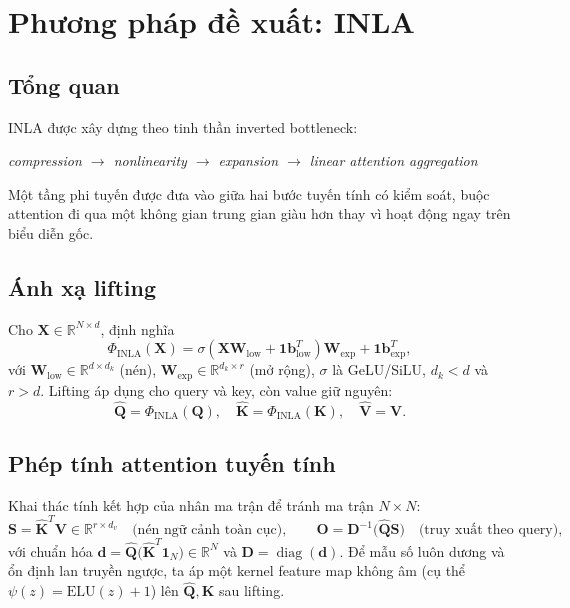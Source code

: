 \documentclass[12pt,a4paper]{article}
\begin{document}
\section{Phương pháp đề xuất: INLA}
\label{sec:method}

\subsection{Tổng quan}
INLA được xây dựng theo tinh thần inverted bottleneck:
\begin{center}
\textit{compression $\rightarrow$ nonlinearity $\rightarrow$ expansion $\rightarrow$ linear attention aggregation}
\end{center}
Một tầng phi tuyến được đưa vào giữa hai bước tuyến tính có kiểm soát, buộc attention đi qua một
không gian trung gian giàu hơn thay vì hoạt động ngay trên biểu diễn gốc.

\subsection{Ánh xạ lifting}
Cho $\mathbf{X} \in \mathbb{R}^{N \times d}$, định nghĩa
\begin{equation}
\Phi_{\mathrm{INLA}}(\mathbf{X}) = \sigma\!\left(\mathbf{X}\mathbf{W}_{\mathrm{low}} + \mathbf{1}\mathbf{b}_{\mathrm{low}}^T\right)\mathbf{W}_{\mathrm{exp}} + \mathbf{1}\mathbf{b}_{\mathrm{exp}}^T,
\end{equation}
với $\mathbf{W}_{\mathrm{low}} \in \mathbb{R}^{d \times d_k}$ (nén), $\mathbf{W}_{\mathrm{exp}} \in
\mathbb{R}^{d_k \times r}$ (mở rộng), $\sigma$ là GeLU/SiLU, $d_k < d$ và $r > d$. Lifting áp dụng
cho query và key, còn value giữ nguyên:
\begin{equation}
\hat{\mathbf{Q}} = \Phi_{\mathrm{INLA}}(\mathbf{Q}), \quad
\hat{\mathbf{K}} = \Phi_{\mathrm{INLA}}(\mathbf{K}), \quad
\hat{\mathbf{V}} = \mathbf{V}.
\end{equation}

\subsection{Phép tính attention tuyến tính}
Khai thác tính kết hợp của nhân ma trận để tránh ma trận $N\times N$:
\begin{equation}
\mathbf{S} = \hat{\mathbf{K}}^T\mathbf{V} \in \mathbb{R}^{r \times d_v}
\quad\text{(nén ngữ cảnh toàn cục)},\qquad
\mathbf{O} = \mathbf{D}^{-1}\big(\hat{\mathbf{Q}}\mathbf{S}\big)
\quad\text{(truy xuất theo query)},
\end{equation}
với chuẩn hóa $\mathbf{d} = \hat{\mathbf{Q}}\big(\hat{\mathbf{K}}^T\mathbf{1}_N\big) \in \mathbb{R}^N$
và $\mathbf{D} = \operatorname{diag}(\mathbf{d})$. Để mẫu số luôn dương và ổn định lan truyền ngược,
ta áp một kernel feature map không âm (cụ thể $\psi(z)=\mathrm{ELU}(z)+1$) lên $\hat{\mathbf{Q}},
\hat{\mathbf{K}}$ sau lifting.
\end{document}

